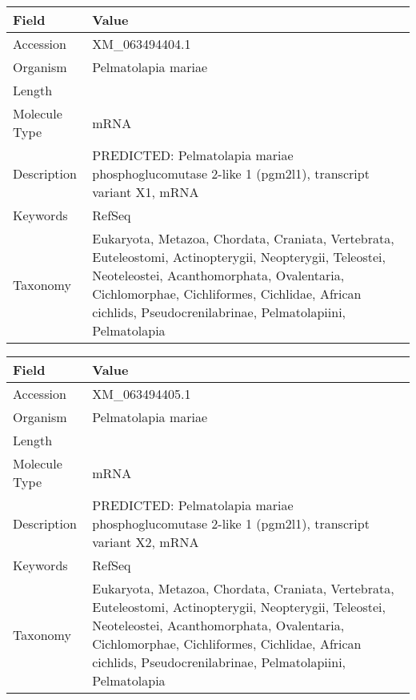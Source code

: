 \documentclass[10pt]{article}
\begin{document}
\vspace{1em}
{\footnotesize
\begin{longtable}{>{\raggedright\arraybackslash}p{4.5cm} >{\raggedright\arraybackslash}p{11.5cm}}
\textbf{Field} & \textbf{Value} \\
\hline
Accession & XM\_063494404.1 \\
Organism & Pelmatolapia mariae \\
Length & 3078 \\
Molecule Type & mRNA \\
Description & PREDICTED: Pelmatolapia mariae phosphoglucomutase 2-like 1 (pgm2l1), transcript variant X1, mRNA \\
Keywords & RefSeq \\
Taxonomy & Eukaryota, Metazoa, Chordata, Craniata, Vertebrata, Euteleostomi, Actinopterygii, Neopterygii, Teleostei, Neoteleostei, Acanthomorphata, Ovalentaria, Cichlomorphae, Cichliformes, Cichlidae, African cichlids, Pseudocrenilabrinae, Pelmatolapiini, Pelmatolapia \\
\end{longtable}
}

\vspace{1em}
{\footnotesize
\begin{longtable}{>{\raggedright\arraybackslash}p{4.5cm} >{\raggedright\arraybackslash}p{11.5cm}}
\textbf{Field} & \textbf{Value} \\
\hline
Accession & XM\_063494405.1 \\
Organism & Pelmatolapia mariae \\
Length & 2833 \\
Molecule Type & mRNA \\
Description & PREDICTED: Pelmatolapia mariae phosphoglucomutase 2-like 1 (pgm2l1), transcript variant X2, mRNA \\
Keywords & RefSeq \\
Taxonomy & Eukaryota, Metazoa, Chordata, Craniata, Vertebrata, Euteleostomi, Actinopterygii, Neopterygii, Teleostei, Neoteleostei, Acanthomorphata, Ovalentaria, Cichlomorphae, Cichliformes, Cichlidae, African cichlids, Pseudocrenilabrinae, Pelmatolapiini, Pelmatolapia \\
\end{longtable}
}
\end{document}
